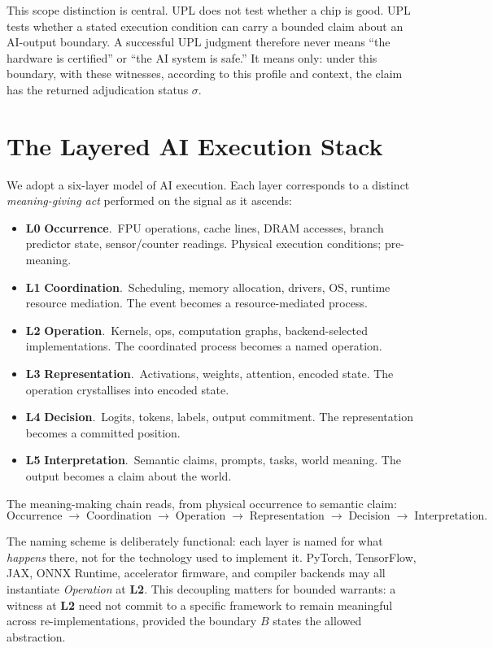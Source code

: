 \documentclass[11pt, a4paper]{article}
\theoremstyle{upldef}
\newcommand{\layer}[1]{\textbf{L#1}}
\begin{document}
This scope distinction is central. UPL does not test whether a chip
is good. UPL tests whether a stated execution condition can carry a
bounded claim about an AI-output boundary. A successful UPL judgment
therefore never means ``the hardware is certified'' or ``the AI
system is safe.'' It means only: under this boundary, with these
witnesses, according to this profile and context, the claim has the
returned adjudication status $\sigma$.

\section{The Layered AI Execution Stack}
\label{sec:stack}

We adopt a six-layer model of AI execution. Each layer corresponds
to a distinct \emph{meaning-giving act} performed on the signal as
it ascends:

\begin{itemize}
\item \layer{0} \textbf{Occurrence}.\ FPU operations, cache lines,
DRAM accesses, branch predictor state, sensor/counter readings.
Physical execution conditions; pre-meaning.
\item \layer{1} \textbf{Coordination}.\ Scheduling, memory
allocation, drivers, OS, runtime resource mediation. The event
becomes a resource-mediated process.
\item \layer{2} \textbf{Operation}.\ Kernels, ops, computation
graphs, backend-selected implementations. The coordinated process
becomes a named operation.
\item \layer{3} \textbf{Representation}.\ Activations, weights,
attention, encoded state. The operation crystallises into encoded
state.
\item \layer{4} \textbf{Decision}.\ Logits, tokens, labels, output
commitment. The representation becomes a committed position.
\item \layer{5} \textbf{Interpretation}.\ Semantic claims, prompts,
tasks, world meaning. The output becomes a claim about the world.
\end{itemize}

\noindent
The meaning-making chain reads, from physical occurrence to
semantic claim:
\[
\text{Occurrence}
\;\to\;\text{Coordination}
\;\to\;\text{Operation}
\;\to\;\text{Representation}
\;\to\;\text{Decision}
\;\to\;\text{Interpretation}.
\]

The naming scheme is deliberately functional: each layer is named
for what \emph{happens} there, not for the technology used to
implement it. PyTorch, TensorFlow, JAX, ONNX Runtime, accelerator
firmware, and compiler backends may all instantiate \emph{Operation}
at \layer{2}. This decoupling matters for bounded warrants: a
witness at \layer{2} need not commit to a specific framework to
remain meaningful across re-implementations, provided the boundary
$B$ states the allowed abstraction.
\end{document}
